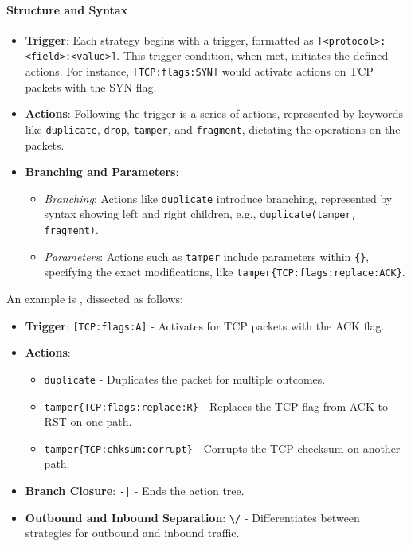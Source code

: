 \documentclass[12pt, fleqn, a4paper]{article}
\begin{document}
\paragraph{Structure and Syntax}
\begin{itemize}
    \item \textbf{Trigger}: Each strategy begins with a trigger, formatted as \texttt{[<protocol>:<field>:<value>]}. This trigger condition, when met, initiates the defined actions. For instance, \texttt{[TCP:flags:SYN]} would activate actions on TCP packets with the SYN flag.

    \item \textbf{Actions}: Following the trigger is a series of actions, represented by keywords like \texttt{duplicate}, \texttt{drop}, \texttt{tamper}, and \texttt{fragment}, dictating the operations on the packets.

    \item \textbf{Branching and Parameters}:
    \begin{itemize}
        \item \textit{Branching}: Actions like \texttt{duplicate} introduce branching, represented by syntax showing left and right children, e.g., \texttt{duplicate(tamper{}, fragment{})}.
        \item \textit{Parameters}: Actions such as \texttt{tamper} include parameters within \texttt{\{\}}, specifying the exact modifications, like \texttt{tamper\{TCP:flags:replace:ACK\}}.
    \end{itemize}
\end{itemize}

An example is 
, dissected as follows:
\begin{itemize}
    \item \textbf{Trigger}: \texttt{[TCP:flags:A]} - Activates for TCP packets with the ACK flag.
    \item \textbf{Actions}:
    \begin{itemize}
        \item \texttt{duplicate} - Duplicates the packet for multiple outcomes.
        \item \texttt{tamper\{TCP:flags:replace:R\}} - Replaces the TCP flag from ACK to RST on one path.
        \item \texttt{tamper\{TCP:chksum:corrupt\}} - Corrupts the TCP checksum on another path.
    \end{itemize}
    \item \textbf{Branch Closure}: \texttt{-|} - Ends the action tree.
    \item \textbf{Outbound and Inbound Separation}: \texttt{\textbackslash/} - Differentiates between strategies for outbound and inbound traffic.
\end{itemize}
\end{document}
